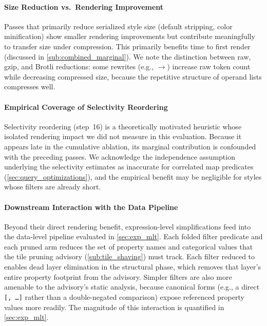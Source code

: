 \paragraph{Size Reduction vs.\ Rendering Improvement}
Passes that primarily reduce serialized style size (default stripping, color minification) show smaller rendering improvements but contribute meaningfully to transfer size under compression.
This primarily benefits time to first render (discussed in \cref{sub:combined_marginal}).
We note the distinction between raw, gzip, and Brotli reductions: some rewrites (e.g., $\to$) increase raw token count while decreasing compressed size, because the repetitive structure of  operand lists compresses well.

\paragraph{Empirical Coverage of Selectivity Reordering}
Selectivity reordering (step~16) is a theoretically motivated heuristic whose isolated rendering impact we did not measure in this evaluation.
Because it appears late in the cumulative ablation, its marginal contribution is confounded with the preceding passes.
We acknowledge the independence assumption underlying the selectivity estimates as inaccurate for correlated map predicates (\cref{sec:query_optimizations}), and the empirical benefit may be negligible for styles whose filters are already short.

\paragraph{Downstream Interaction with the Data Pipeline}
Beyond their direct rendering benefit, expression-level simplifications feed into the data-level pipeline evaluated in \cref{sec:exp_mlt}.
Each folded filter predicate and each pruned  arm reduces the set of property names and categorical values that the tile pruning advisory (\cref{sub:tile_shaving}) must track.
Each filter reduced to  enables dead layer elimination in the structural phase, which removes that layer's entire property footprint from the advisory.
Simpler filters are also more amenable to the advisory's static analysis, because canonical forms (e.g., a direct \texttt{[,~\ldots]} rather than a double-negated comparison) expose referenced property values more readily.
The magnitude of this interaction is quantified in \cref{sec:exp_mlt}.


